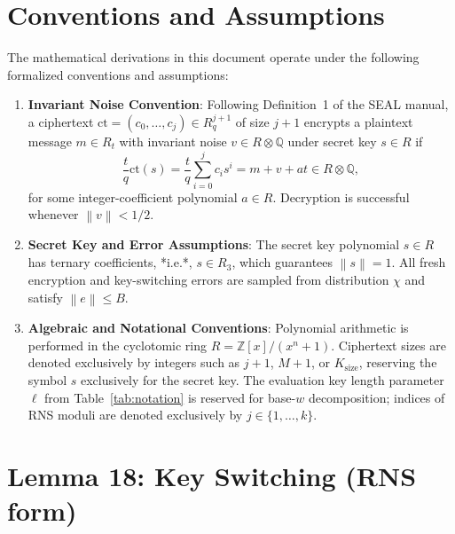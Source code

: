 \documentclass[11pt]{article}
\theoremstyle{definition}
\theoremstyle{remark}
\newcommand{\norm}[1]{\left\lVert #1\right\rVert}
\newcommand{\ct}{\mathrm{ct}}
\begin{document}
\section*{Conventions and Assumptions}

The mathematical derivations in this document operate under the following formalized conventions and assumptions:

\begin{enumerate}[leftmargin=2em]
\item \textbf{Invariant Noise Convention}:
Following Definition~1 of the SEAL manual, a ciphertext $\ct = (c_0, \dots, c_j) \in R_q^{j+1}$ of size $j+1$ encrypts a plaintext message $m \in R_t$ with invariant noise $v \in R \otimes \mathbb{Q}$ under secret key $s \in R$ if
\[
  \frac{t}{q}\ct(s) = \frac{t}{q}\sum_{i=0}^j c_i s^i = m + v + at \in R \otimes \mathbb{Q},
\]
for some integer-coefficient polynomial $a \in R$.
Decryption is successful whenever $\norm{v} < 1/2$.

\item \textbf{Secret Key and Error Assumptions}:
The secret key polynomial $s \in R$ has ternary coefficients, *i.e.*, $s \in R_3$, which guarantees $\norm{s} = 1$.
All fresh encryption and key-switching errors are sampled from distribution $\chi$ and satisfy $\norm{e} \leq B$.

\item \textbf{Algebraic and Notational Conventions}:
Polynomial arithmetic is performed in the cyclotomic ring $R = \mathbb{Z}[x]/(x^n+1)$.
Ciphertext sizes are denoted exclusively by integers such as $j+1$, $M+1$, or $K_{\mathrm{size}}$, reserving the symbol $s$ exclusively for the secret key.
The evaluation key length parameter $\ell$ from Table~\ref{tab:notation} is reserved for base-$w$ decomposition; indices of RNS moduli are denoted exclusively by $j \in \{1, \dots, k\}$.
\end{enumerate}

\section*{Lemma 18: Key Switching (RNS form)}
\end{document}
